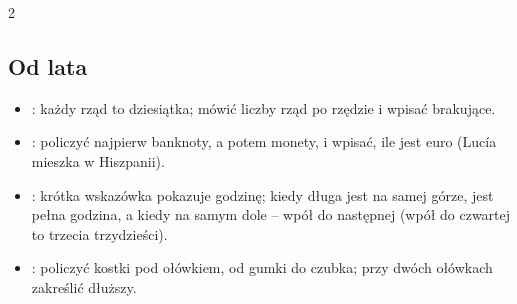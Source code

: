 {\begin{multicols}{2}
\subsection*{Od lata}
\begin{itemize}[leftmargin=5mm, itemsep=1pt, topsep=0pt]
\item \textbf{\lblTabla}: każdy rząd to dziesiątka; mówić liczby rząd po
  rzędzie i wpisać brakujące.
\item \textbf{\lblDinero}: policzyć najpierw banknoty, a potem monety, i
  wpisać, ile jest euro (Lucía mieszka w Hiszpanii).
\item \textbf{\lblHora}: krótka wskazówka pokazuje godzinę; kiedy długa
  jest na samej górze, jest pełna godzina, a kiedy na samym dole -- wpół
  do następnej (wpół do czwartej to trzecia trzydzieści).
\item \textbf{\lblMide}: policzyć kostki pod ołówkiem, od gumki do
  czubka; przy dwóch ołówkach zakreślić dłuższy.
\end{itemize}
\end{multicols}}
\newpage
